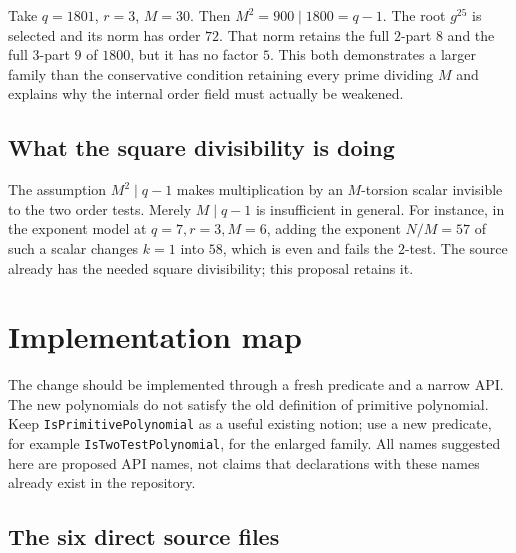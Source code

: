 \documentclass[11pt,a4paper]{article}
\theoremstyle{definition}
\theoremstyle{remark}
\newcommand{\code}[1]{{\small\nolinkurl{#1}}}
\begin{document}
Take \(q=1801\), \(r=3\), \(M=30\). Then \(M^2=900\mid1800=q-1\).
The root \(g^{25}\) is selected and its norm has order \(72\).
That norm retains the full \(2\)-part \(8\) and the full \(3\)-part \(9\)
of \(1800\), but it has no factor \(5\).
This both demonstrates a larger family than the conservative condition retaining
every prime dividing \(M\) and explains why the internal order field
must actually be weakened.

\subsection{What the square divisibility is doing}

The assumption \(M^2\mid q-1\) makes multiplication by an \(M\)-torsion scalar
invisible to the two order tests. Merely \(M\mid q-1\) is insufficient in general.
For instance, in the exponent model at \(q=7,r=3,M=6\), adding the exponent
\(N/M=57\) of such a scalar changes \(k=1\) into \(58\), which is even and
fails the \(2\)-test. The source already has the needed square divisibility;
this proposal retains it.

\clearpage
\section{Implementation map}
\label{sec:integration}

The change should be implemented through a fresh predicate and a narrow API.
The new polynomials do not satisfy the old definition of primitive polynomial.
Keep \code{IsPrimitivePolynomial} as a useful existing notion; use a new
predicate, for example \code{IsTwoTestPolynomial}, for the enlarged family.
All names suggested here are proposed API names, not claims that declarations
with these names already exist in the repository.

\subsection{The six direct source files}
\end{document}
